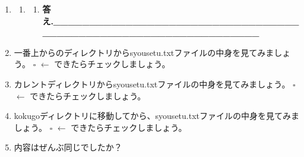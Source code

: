 \documentclass[a4paper,dvipdfmx]{jarticle}
\newcounter{saveenum}
\begin{document}
\setcounter{saveenum}{\value{enumi}}
\begin{enumerate}
\setcounter{enumi}{\value{saveenum}}
\item[] 
\bigskip

\setcounter{saveenum}{\value{enumii}}
\begin{enumerate}
\setcounter{enumii}{\value{saveenum}}
\item \setcounter{saveenum}{\value{enumiii}}
\begin{enumerate}
\setcounter{enumiii}{\value{saveenum}}
\item[] {\ttfamily\bfseries
答え.\_\_\_\_\_\_\_\_\_\_\_\_\_\_\_\_\_\_\_\_\_\_\_\_\_\_\_\_\_\_\_\_\_\_\_\_\_\_\_\_\_\_\_\_\_\_\_\_\_\_\_\_\_\_\_\_\_\_\_\_\_\_\_\_}
\end{enumerate}

\bigskip
\end{enumerate}
\item
一番上からのディレクトリからsyousetu.txtファイルの中身を見てみましょう。\newline
${\square}$ $\leftarrow $
できたらチェックしましょう。
\item
カレントディレクトリからsyousetu.txtファイルの中身を見てみましょう。\newline
${\square}$ $\leftarrow $
できたらチェックしましょう。
\item
kokugoディレクトリに移動してから、syousetu.txtファイルの中身を見てみましょう。\newline
${\square}$ $\leftarrow $
できたらチェックしましょう。
\item 内容はぜんぶ同じでしたか？
\end{enumerate}

\bigskip
\end{document}
